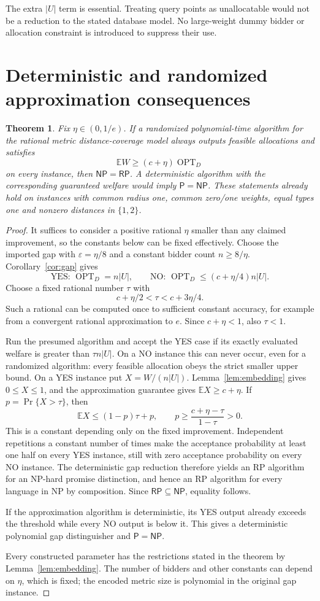 \documentclass[11pt]{article}
\newtheorem{theorem}{Theorem}
\newcommand{\OPT}{\operatorname{OPT}}
\newcommand{\E}{\mathbb E}
\newcommand{\NP}{\mathsf{NP}}
\newcommand{\RP}{\mathsf{RP}}
\newcommand{\Ptime}{\mathsf{P}}
\begin{document}
The extra $|U|$ term is essential. Treating query points as unallocatable would not be a reduction to the stated database model. No large-weight dummy bidder or allocation constraint is introduced to suppress their use.

\section{Deterministic and randomized approximation consequences}
\begin{theorem}\label{thm:hardness}
Fix $\eta\in(0,1/e)$. If a randomized polynomial-time algorithm for the rational metric distance-coverage model always outputs feasible allocations and satisfies
\[
 \E W\ge(c+\eta)\OPT_D
\]
on every instance, then $\NP=\RP$. A deterministic algorithm with the corresponding guaranteed welfare would imply $\Ptime=\NP$. These statements already hold on instances with common radius one, common zero/one weights, equal types one and nonzero distances in $\{1,2\}$.
\end{theorem}
\begin{proof}
It suffices to consider a positive rational $\eta$ smaller than any claimed improvement, so the constants below can be fixed effectively. Choose the imported gap with $\varepsilon=\eta/8$ and a constant bidder count $n\ge8/\eta$. Corollary~\ref{cor:gap} gives
\[
 \text{YES: }\OPT_D=n|U|,\qquad
 \text{NO: }\OPT_D\le(c+\eta/4)n|U|.
\]
Choose a fixed rational number $\tau$ with
\[
 c+\eta/2<\tau<c+3\eta/4.
\]
Such a rational can be computed once to sufficient constant accuracy, for example from a convergent rational approximation to $e$. Since $c+\eta<1$, also $\tau<1$.

Run the presumed algorithm and accept the YES case if its exactly evaluated welfare is greater than $\tau n|U|$. On a NO instance this can never occur, even for a randomized algorithm: every feasible allocation obeys the strict smaller upper bound. On a YES instance put $X=W/(n|U|)$. Lemma~\ref{lem:embedding} gives $0\le X\le1$, and the approximation guarantee gives $\E X\ge c+\eta$. If $p=\Pr\{X>\tau\}$, then
\[
 \E X\le (1-p)\tau+p,
 \qquad p\ge\frac{c+\eta-\tau}{1-\tau}>0.
\]
This is a constant depending only on the fixed improvement. Independent repetitions a constant number of times make the acceptance probability at least one half on every YES instance, still with zero acceptance probability on every NO instance. The deterministic gap reduction therefore yields an RP algorithm for an NP-hard promise distinction, and hence an RP algorithm for every language in NP by composition. Since $\RP\subseteq\NP$, equality follows.

If the approximation algorithm is deterministic, its YES output already exceeds the threshold while every NO output is below it. This gives a deterministic polynomial gap distinguisher and $\Ptime=\NP$.

Every constructed parameter has the restrictions stated in the theorem by Lemma~\ref{lem:embedding}. The number of bidders and other constants can depend on $\eta$, which is fixed; the encoded metric size is polynomial in the original gap instance.
\end{proof}
\end{document}

